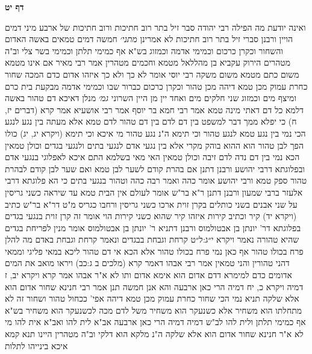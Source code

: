 \documentclass[12pt, openany]{book}
\newcommand{\sethebfont}{
\fontsize{10.5pt}{21.0pt} \selectfont
}
\newcommand{\twocol}[1]{
	{\sethebfont \begin{multicols}{2}
			#1
	\end{multicols}}	
}
\newcommand{\sectname}{}
\newcommand{\newsection}[1]{
	\addcontentsline{toc}{section}{#1}
	\renewcommand{\sectname}{#1}	
	\vspace{-\baselineskip}
	\begin{center}
		\textbf{%
\fontsize{16pt}{16pt}\selectfont
			#1}
	\end{center}
	\vspace{-\baselineskip}
	\nopagebreak
}
\begin{document}
\newsection{דף יט}
\twocol{ואינה יודעת מה הפילה רבי יהודה סבר זיל בתר רוב חתיכות ורוב חתיכות של ארבע מיני דמים הויין ורבנן סברי זיל בתר רוב חתיכות לא אמרינן
{\large\emph{מתני׳}} חמשה דמים טמאים באשה האדום והשחור וכקרן כרכום וכמימי אדמה וכמזוג בש"א אף כמימי תלתן וכמימי בשר צלי וב"ה מטהרים הירוק עקביא בן מהללאל מטמא וחכמים מטהרין 
אמר רבי מאיר אם אינו מטמא משום כתם מטמא משום משקה רבי יוסי אומר לא כך ולא כך 
איזהו אדום כדם המכה שחור כחרת עמוק מכן טמא דיהה מכן טהור וכקרן כרכום כברור שבו 
וכמימי אדמה מבקעת בית כרם ומיצף מים וכמזוג שני חלקים מים ואחד יין מן היין השרוני
{\large\emph{גמ׳}} מנלן דאיכא דם טהור באשה דלמא כל דם דאתי מינה טמא 
אמר רבי חמא בר יוסף אמר רבי אושעיא אמר קרא (דברים יז, ח) כי יפלא ממך דבר למשפט בין דם לדם בין דם טהור לדם טמא 
אלא מעתה בין נגע לנגע הכי נמי בין נגע טמא לנגע טהור וכי תימא ה"נ נגע טהור מי איכא וכי תימא (ויקרא יג, יג) כולו הפך לבן טהור הוא ההוא בוהק מקרי 
אלא בין נגעי אדם לנגעי בתים ולנגעי בגדים וכולן טמאין הכא נמי בין דם נדה לדם זיבה וכולן טמאין 
האי מאי בשלמא התם איכא לאפלוגי בנגעי אדם ובפלוגתא דרבי יהושע ורבנן
דתנן אם בהרת קודם לשער לבן טמא ואם שער לבן קודם לבהרת טהור ספק טמא ורבי יהושע אומר כהה ואמר רבה כהה וטהור 
בנגעי בתים כי הא פלוגתא דרבי אלעזר ברבי שמעון ורבנן דתנן ר"א בר"ש אומר לעולם אין הבית טמא עד שיראה כשני גריסין על שני אבנים בשני כותלים בקרן זוית ארכו כשני גריסין ורחבו כגריס 
מ"ט דר"א בר"ש כתיב (ויקרא יד) קיר וכתיב קירות איזהו קיר שהוא כשני קירות הוי אומר זה קרן זוית 
בנגעי בגדים בפלוגתא דר' יונתן בן אבטולמוס ורבנן דתניא ר' יונתן בן אבטולמוס אומר מנין לפריחת בגדים שהיא טהורה
נאמר {ויקרא י״ג:ל״ט } קרחת וגבחת בבגדים ונאמר קרחת וגבחת באדם
מה להלן פרח בכולו טהור אף כאן נמי פרח בכולו טהור 
אלא הכא אי דם טהור ליכא במאי פליגי 
וממאי דהני טהורין והני טמאין אמר רבי אבהו דאמר קרא (מלכים ב ג:כב) ויראו מואב את המים אדומים כדם למימרא דדם אדום הוא אימא אדום ותו לא 
א"ר אבהו אמר קרא {ויקרא יב, ז} דמיה {ויקרא כ, יח} דמיה הרי כאן ארבעה 
והא אנן חמשה תנן אמר רבי חנינא שחור אדום הוא אלא שלקה 
תניא נמי הכי שחור כחרת עמוק מכן טמא דיהה אפי' ככחול טהור ושחור זה לא מתחלתו הוא משחיר אלא כשנעקר הוא משחיר משל לדם מכה לכשנעקר הוא משחיר
בש"א אף כמימי תלתן ולית להו לב"ש דמיה דמיה הרי כאן ארבעה 
אב"א לית להו ואב"א אית להו מי לא א"ר חנינא שחור אדום הוא אלא שלקה ה"נ מלקא הוא דלקי
וב"ה מטהרין היינו תנא קמא 
איכא בינייהו
לתלות 
}
\end{document}
